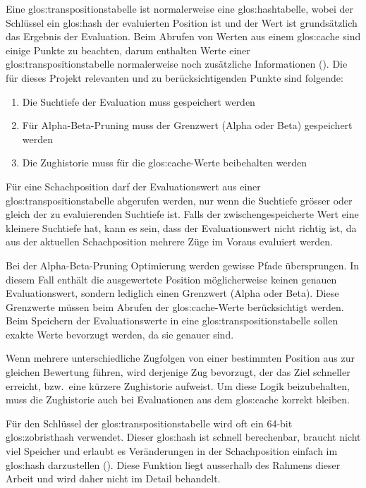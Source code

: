 Eine \gls{glos:transpositionstabelle} ist normalerweise eine \gls{glos:hashtabelle}, wobei der Schlüssel ein \gls{glos:hash} der evaluierten Position ist und der Wert ist grundsätzlich das Ergebnis der Evaluation.
Beim Abrufen von Werten aus einem \gls{glos:cache} sind einige Punkte zu beachten, darum enthalten Werte einer \gls{glos:transpositionstabelle} normalerweise noch zusätzliche Informationen (\cite{transpositiontable}).
Die für dieses Projekt relevanten und zu berücksichtigenden Punkte sind folgende:
\begin{enumerate}
    \item Die Suchtiefe der Evaluation muss gespeichert werden
    \item Für Alpha-Beta-Pruning muss der Grenzwert (Alpha oder Beta) gespeichert werden
    \item Die Zughistorie muss für die \gls{glos:cache}-Werte beibehalten werden
\end{enumerate}
Für eine Schachposition darf der Evaluationswert aus einer \gls{glos:transpositionstabelle} abgerufen werden, nur wenn die Suchtiefe grösser oder gleich der zu evaluierenden Suchtiefe ist.
Falls der zwischengespeicherte Wert eine kleinere Suchtiefe hat, kann es sein, dass der Evaluationswert nicht richtig ist, da aus der aktuellen Schachposition mehrere Züge im Voraus evaluiert werden.

Bei der Alpha-Beta-Pruning Optimierung werden gewisse Pfade übersprungen.
In diesem Fall enthält die ausgewertete Position möglicherweise keinen genauen Evaluationswert, sondern lediglich einen Grenzwert (Alpha oder Beta).
Diese Grenzwerte müssen beim Abrufen der \gls{glos:cache}-Werte berücksichtigt werden.
Beim Speichern der Evaluationswerte in eine \gls{glos:transpositionstabelle} sollen exakte Werte bevorzugt werden, da sie genauer sind.

Wenn mehrere unterschiedliche Zugfolgen von einer bestimmten Position aus zur gleichen Bewertung führen, wird derjenige Zug bevorzugt, der das Ziel schneller erreicht, bzw.\ eine kürzere Zughistorie aufweist.
Um diese Logik beizubehalten, muss die Zughistorie auch bei Evaluationen aus dem \gls{glos:cache} korrekt bleiben.

Für den Schlüssel der \gls{glos:transpositionstabelle} wird oft ein 64-bit \gls{glos:zobristhash} verwendet.
Dieser \gls{glos:hash} ist schnell berechenbar, braucht nicht viel Speicher und erlaubt es Veränderungen in der Schachposition einfach im \gls{glos:hash} darzustellen (\cite{zobristhash}).
Diese Funktion liegt ausserhalb des Rahmens dieser Arbeit und wird daher nicht im Detail behandelt.
